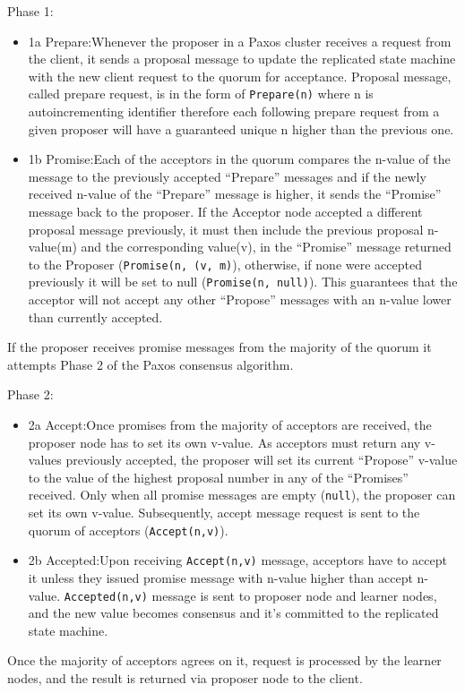 \documentclass[oneside,12pt]{book}
\begin{document}
\par Phase 1:
\begin{itemize}
  \item 1a Prepare:\smallskip \newline Whenever the proposer in a Paxos cluster receives a request from the client, it sends a proposal message to update the replicated state machine with the new client request to the quorum for acceptance. Proposal message, called prepare request, is in the form of \texttt{Prepare(n)} where n is autoincrementing identifier therefore each following prepare request from a given proposer will have a guaranteed unique n higher than the previous one.
  
  \item 1b Promise:\smallskip \newline Each of the acceptors in the quorum compares the n-value of the message to the previously accepted “Prepare” messages and if the newly received n-value of the “Prepare” message is higher, it sends the “Promise” message back to the proposer. If the Acceptor node accepted a different proposal message previously, it must then include the previous proposal n-value(m) and the corresponding value(v), in the “Promise” message returned to the Proposer (\texttt{Promise(n, (v, m)}), otherwise, if none were accepted previously it will be set to null (\texttt{Promise(n, null)}). This guarantees that the acceptor will not accept any other “Propose” messages with an n-value lower than currently accepted.
\end{itemize}
If the proposer receives promise messages from the majority of the quorum it attempts Phase 2 of the Paxos consensus algorithm.\smallskip \newline

Phase 2:
\begin{itemize}
  \item 2a Accept:\smallskip \newline Once promises from the majority of acceptors are received, the proposer node has to set its own v-value. As acceptors must return any v-values previously accepted, the proposer will set its current “Propose” v-value to the value of the highest proposal number in any of the “Promises” received. Only when all promise messages are empty (\texttt{null}), the proposer can set its own v-value. Subsequently, accept message request is sent to the quorum of acceptors (\texttt{Accept(n,v)}).
  
  \item 2b Accepted:\smallskip \newline Upon receiving \texttt{Accept(n,v)} message, acceptors have to accept it unless they issued promise message with n-value higher than accept n-value. \texttt{Accepted(n,v)} message is sent to proposer node and learner nodes, and the new value becomes consensus and it's committed to the replicated state machine.
\end{itemize}
Once the majority of acceptors agrees on it, request is processed by the learner nodes, and the result is returned via proposer node to the client.
\end{document}
